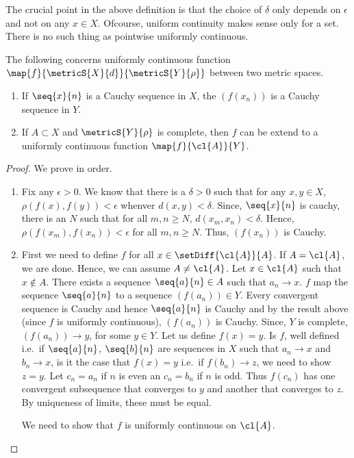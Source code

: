 \begin{Remark}
    The crucial point in the above definition is that the choice of $\delta$ only depends on $\epsilon$ and
    not on any $x \in X$. Ofcourse, uniform continuity makes sense only for a set. There is no such thing as
    pointwise uniformly continuous.
\end{Remark}
\begin{Theorem}
    The following concerns uniformly continuous function $\map{f}{\metricS{X}{d}}{\metricS{Y}{\rho}}$ between
    two metric spaces.
    \begin{enumerate}
	\item
	    If $\seq{x}{n}$ is a Cauchy sequence in $X$, the $(f(x_n))$ is a Cauchy sequence in $Y$.
	\item
	    If $A \subset X$ and $\metricS{Y}{\rho}$ is complete, then $f$ can be extend to a uniformly
	    continuous function $\map{f}{\cl{A}}{Y}$.
    \end{enumerate}
\end{Theorem}
\begin{proof}
    We prove in order.
    \begin{enumerate}
	\item
	    Fix any $\epsilon > 0$. We know that there is a $\delta > 0$ such that for any $x,y \in X$,
	    $\rho(f(x),f(y)) < \epsilon$ whenver $d(x,y) < \delta$. Since, $\seq{x}{n}$ is cauchy, there is an
	    $N$ such that for all $m,n \geq N$, $d(x_m,x_n) < \delta$. Hence, $\rho(f(x_m),f(x_n)) < \epsilon$
	    for all $m,n \geq N$. Thus, $(f(x_n))$ is Cauchy. 
	\item
	    First we need to define $f$ for all $x \in \setDiff{\cl{A}}{A}$. If $A = \cl{A}$, we are done.
	    Hence, we can assume $A \neq \cl{A}$. Let $x \in \cl{A}$ such that $x \not \in A$. There exists a
	    sequence $\seq{a}{n} \in A$ such that $a_n \to x$. $f$ map the
	    sequence $\seq{a}{n}$ to a sequence $(f(a_n)) \in Y$. Every convergent sequence is Cauchy and
	    hence $\seq{a}{n}$ is Cauchy and by the result above (since $f$ is uniformly continuous), 
	    $(f(a_n))$ is Cauchy. Since, $Y$ is
	    complete, $(f(a_n)) \to y$, for some $y \in Y$. Let us define $f(x) = y$. Is $f$, well defined
	    i.e.~if $\seq{a}{n}$, $\seq{b}{n}$ are sequences in $X$ such that $a_n\to x$ and $b_n\to x$, is it
	    the case that $f(x) = y$ i.e.~if $f(b_n)\to z$, we need to show $z = y$. Let $c_n = a_n$ if $n$ is
	    even an $c_n = b_n$ if $n$ is odd. Thus $f(c_n)$ has one convergent subsequence that converges to
	    $y$ and another that converges to $z$. By uniqueness of limits, these must be equal.

	    We need to show that $f$ is uniformly continuous on $\cl{A}$.


    \end{enumerate}
\end{proof}

